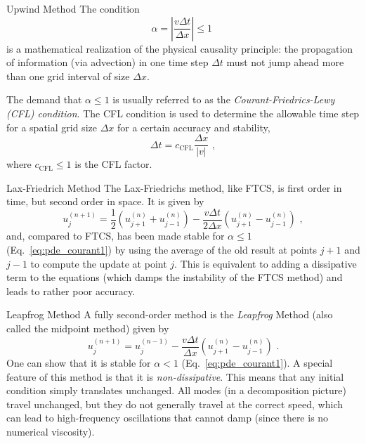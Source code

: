 \documentclass[11pt]{beamer}
\begin{document}
\begin{frame}[fragile]{Upwind Method}
The condition
\begin{equation}
\alpha = \left|\frac{v\Delta t}{\Delta x}\right| \le 1\,\,
\label{eq:pde_courant1}
\end{equation}
 is a mathematical realization of the
physical causality principle: the propagation of information
(via advection) in one time step $\Delta t$ must not jump
ahead more than one grid interval of size $\Delta x$.

The demand that $\alpha \le 1$ is usually referred to as the 
\emph{Courant-Friedrics-Lewy (CFL) condition}. The
CFL condition is used to determine the  allowable time
step for a spatial grid size $\Delta x$ for a certain accuracy and
stability, 
\begin{equation}
\Delta t = c_\mathrm{CFL} \frac{\Delta x}{|v|}\,\,,
\end{equation}
where $c_\mathrm{CFL} \le 1$ is the CFL factor.
\end{frame}

\begin{frame}[fragile]{Lax-Friedrich Method}
The Lax-Friedrichs method, like FTCS, is first order in time, but
second order in space. It is given by
\begin{equation}
u_{j}^{(n+1)} = \frac{1}{2}\left(u^{(n)}_{j+1} + u^{(n)}_{j-1}\right) - 
\frac{v \Delta t}{2\Delta x} \left(u^{(n)}_{j+1} - u^{(n)}_{j-1}\right)\,\,,
\end{equation}
and, compared to FTCS, has been made stable for $\alpha \le 1$
(Eq.~\ref{eq:pde_courant1}) by using the average of the old result at
points $j+1$ and $j-1$ to compute the update at point $j$. This is
equivalent to adding a dissipative term to the equations (which damps
the instability of the FTCS method) and leads to rather poor accuracy.
\end{frame}

\begin{frame}[fragile]{Leapfrog Method}
A fully second-order method is the \emph{Leapfrog} Method (also called the
midpoint method) given by
\begin{equation}
u_j^{(n+1)} = u_j^{(n-1)} - \frac{v \Delta t}{\Delta
x} \left(u^{(n)}_{j+1} - u^{(n)}_{j-1}\right)\,\,.
\end{equation}
One can show that it is stable for $\alpha < 1$
(Eq.~\ref{eq:pde_courant1}).  A special feature of this method is that
it is \emph{non-dissipative}. This means that any initial condition
simply translates unchanged. All modes (in a decomposition picture) travel
unchanged, but they do not generally travel at the correct speed, which
can lead to high-frequency oscillations that cannot damp (since there
is no numerical viscosity).
\end{frame}
\end{document}
